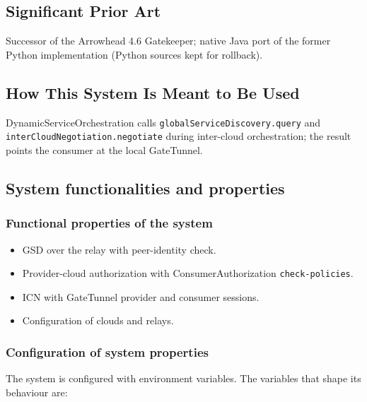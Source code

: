 \documentclass[a4paper]{arrowhead}
\begin{document}
\newpage

\subsection{Significant Prior Art}
\label{sec:prior_art}

Successor of the Arrowhead 4.6 Gatekeeper; native Java port of the former Python implementation (Python sources kept for rollback).

\subsection{How This System Is Meant to Be Used}
\label{sec:use}

Dynamic\allowbreak{}Service\allowbreak{}Orchestration calls \texttt{global\allowbreak{}Service\allowbreak{}Discovery.\allowbreak{}query} and \texttt{inter\allowbreak{}Cloud\allowbreak{}Negotiation.\allowbreak{}negotiate} during inter-cloud orchestration; the result points the consumer at the local GateTunnel.

\subsection{System functionalities and properties}
\label{sec:properties}

\subsubsection{Functional properties of the system}

\begin{itemize}
  \item GSD over the relay with peer-identity check.
  \item Provider-cloud authorization with Consumer\allowbreak{}Authorization \texttt{check-\allowbreak{}policies}.
  \item ICN with GateTunnel provider and consumer sessions.
  \item Configuration of clouds and relays.
\end{itemize}

\subsubsection{Configuration of system properties}

The system is configured with environment variables. The variables that shape its behaviour are:
\end{document}
